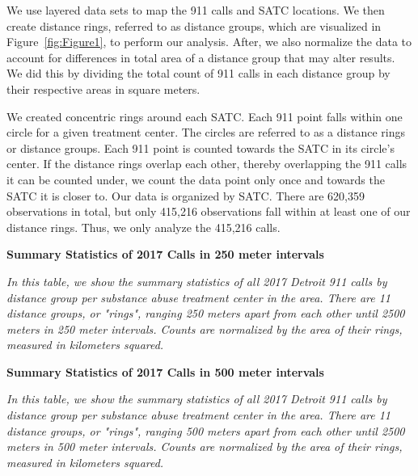 \documentclass[12pt]{article}
\begin{document}
We use layered data sets to map the 911 calls and SATC locations. We then create distance rings, referred to as distance groups, which are visualized in Figure~\ref{fig:Figure1}, to perform our analysis. After, we also normalize the data to account for differences in total area of a distance group that may alter results. We did this by dividing the total count of 911 calls in each distance group by their respective areas in square meters.

We created concentric rings around each SATC. Each 911 point falls within one circle for a given treatment center.  The circles are referred to as a distance rings or distance groups. Each 911 point is  counted towards the SATC in its circle's center. If the distance rings overlap each other, thereby overlapping the 911 calls it can be counted under, we count the data point only once and towards the SATC it is closer to. Our data is organized by SATC. There are 620,359 observations in total, but only 415,216 observations fall within at least one of our distance rings. Thus, we only analyze the 415,216 calls. 

\begin{table}[h]
\centering
\scalebox{0.8}{
\centering

}
\caption{\textbf{Summary Statistics of 2017 Calls in 250 meter intervals}}
\label{tabl:Table}
\centering\textit{In this table, we show the summary statistics of all 2017 Detroit 911 calls by distance group per substance abuse treatment center in the area. There are 11 distance groups, or "rings", ranging 250 meters apart from each other until 2500 meters in 250 meter intervals. Counts are normalized by the area of their rings, measured in kilometers squared. }
\end{table}

\begin{table}[h]
\centering
\scalebox{0.8}{
\centering

}
\caption{\textbf{Summary Statistics of 2017 Calls in 500 meter intervals}}
\label{tabl:Table}
\centering\textit{In this table, we show the summary statistics of all 2017 Detroit 911 calls by distance group per substance abuse treatment center in the area. There are 11 distance groups, or "rings", ranging 500 meters apart from each other until 2500 meters in 500 meter intervals. Counts are normalized by the area of their rings, measured in kilometers squared. }
\end{table}
\end{document}
